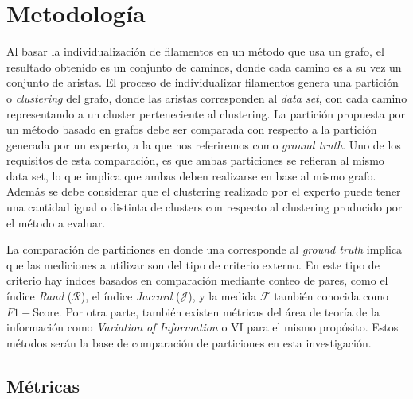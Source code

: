 \chapter{Metodolog\'ia}
\label{chap:metodologia}

Al basar la individualizaci\'on de filamentos en un m\'etodo que usa un grafo, el resultado obtenido es un conjunto de caminos, donde cada camino es a su vez un conjunto de aristas. El proceso de individualizar filamentos genera una partici\'on o {\it clustering} del grafo, donde las aristas corresponden al {\it data set}, con cada camino representando a un cluster perteneciente al clustering. La partici\'on propuesta por un m\'etodo basado en grafos debe ser comparada con respecto a la partici\'on generada por un experto, a la que nos referiremos como {\it ground truth}. Uno de los requisitos de esta comparaci\'on, es que ambas particiones se refieran al mismo data set, lo que implica que ambas deben realizarse en base al mismo grafo. Adem\'as se debe considerar que el clustering realizado por el experto puede tener una cantidad igual o distinta de clusters con respecto al clustering producido por el m\'etodo a evaluar.


La comparaci\'on de particiones en donde una corresponde al {\it ground truth} implica que las mediciones a utilizar son del tipo de criterio externo\cite{manning20introduction}. En este tipo de criterio hay \'indces basados en comparaci\'on mediante conteo de pares, como el \'indice {\it Rand} ($\mathcal{R}$), el \'indice {\it Jaccard} ($\mathcal{J}$), y la medida $\mathcal{F}$ tambi\'en conocida como $F1-$Score. Por otra parte, tambi\'en existen m\'etricas del \'area de teor\'ia de la informaci\'on como {\it Variation of Information} o VI para el mismo prop\'osito. Estos m\'etodos ser\'an la base de comparaci\'on de particiones en esta investigaci\'on.

\section{M\'etricas}

